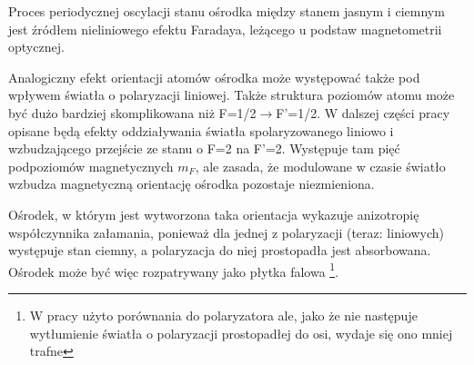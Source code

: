 \documentclass[a4paper,10pt,twoside]{report}
\begin{document}

Proces periodycznej oscylacji stanu ośrodka między stanem jasnym i ciemnym jest źródłem nieliniowego efektu Faradaya, leżącego u podstaw magnetometrii optycznej.

Analogiczny efekt orientacji atomów ośrodka może występować także pod wpływem światła o polaryzacji liniowej. Także struktura poziomów atomu może być dużo bardziej skomplikowana niż F=1/2$\rightarrow$F'=1/2. W dalszej części pracy opisane będą efekty oddziaływania światła spolaryzowanego liniowo i wzbudzającego przejście ze stanu o F=2 na F'=2. Występuje tam pięć podpoziomów magnetycznych $m_F$, ale zasada, że modulowane w czasie światło wzbudza magnetyczną orientację ośrodka pozostaje niezmieniona.


Ośrodek, w którym jest wytworzona taka orientacja wykazuje anizotropię współczynnika załamania, ponieważ dla jednej z polaryzacji (teraz: liniowych) występuje stan ciemny, a polaryzacja do niej prostopadła jest absorbowana. Ośrodek może być więc rozpatrywany jako płytka falowa \footnote{W pracy \cite{rotpol} użyto porównania do polaryzatora ale, jako że nie następuje wytłumienie światła o polaryzacji prostopadłej do osi, wydaje się ono mniej trafne}.

\end{document}
